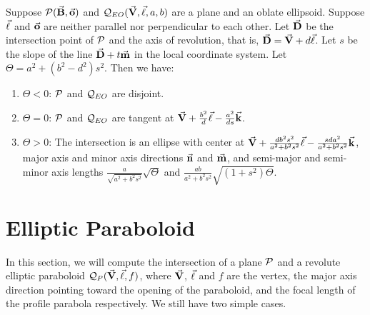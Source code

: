 \begin{theorem}
\label{thm:oblate}
     Suppose ${\cal P}(\vec{\bf B},\vec{\bf o})$ and
${\cal Q}_{EO}(\vec{\bf V},\vec{\bf \ell},a,b)$ are a plane and an oblate
ellipsoid.  Suppose $\vec{\bf \ell}$ and
$\vec{\bf o}$ are neither parallel nor perpendicular to each other.  
Let $\vec{\bf D}$ be the intersection point of ${\cal P}$ and the axis of 
revolution, that is, $\vec{\bf D}=\vec{\bf V}+d\vec{\bf \ell}$.  
Let $s$ be the slope of the
line $\vec{\bf D}+t\vec{\bf m}$ in the local coordinate system.
Let $\Theta=a^2+(b^2-d^2)s^2$.  Then we have:
\begin{enumerate}
     \item $\Theta<0$: ${\cal P}$ and ${\cal Q}_{EO}$ are disjoint.
     \item $\Theta=0$: ${\cal P}$ and ${\cal Q}_{EO}$ are tangent at
          $\vec{\bf V}+\frac{b^2}{d}\vec{\bf \ell}-\frac{a^2}{ds}\vec{\bf k}$.
     \item $\Theta>0$: The intersection is an ellipse with center at
          $\vec{\bf V}+\frac{db^2s^2}{a^2+b^2s^2}\vec{\bf \ell}
               -\frac{sda^2}{a^2+b^2s^2}\vec{\bf k}$, major axis and minor axis
          directions $\vec{\bf n}$ and $\vec{\bf m}$, and semi-major and semi-minor
          axis lengths $\frac{a}{\sqrt{a^2+b^2s^2}}\sqrt{\Theta}$ and
          $\frac{ab}{a^2+b^2s^2}\sqrt{(1+s^2)\Theta}$.
\end{enumerate}
\end{theorem}


\section{Elliptic Paraboloid}
\label{section:elliptic-paraboloid}

     In this section, we will compute the intersection of a plane ${\cal P}$
and a revolute elliptic paraboloid ${\cal Q}_P(\vec{\bf V},\vec{\bf \ell},f)$,
where $\vec{\bf V}$, $\vec{\bf \ell}$ and $f$ are the vertex, the major axis 
direction pointing toward the opening of the paraboloid, and the focal length 
of the profile parabola respectively. We still have two simple cases.

